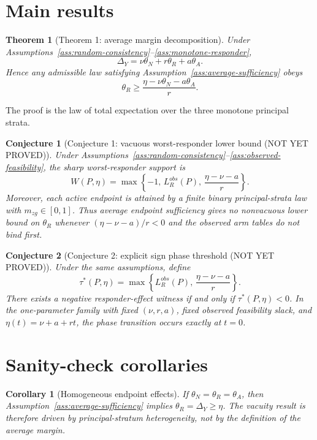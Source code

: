 \documentclass[11pt]{article}
\theoremstyle{definition}
\theoremstyle{plain}
\newtheorem{theorem}{Theorem}
\newtheorem{conjecture}{Conjecture}
\newtheorem{corollary}{Corollary}
\theoremstyle{remark}
\begin{document}
\section{Main results}
\begin{theorem}[Theorem 1: average margin decomposition]\label{thm:decomposition}
Under Assumptions~\ref{ass:random-consistency}--\ref{ass:monotone-responder},
\[
  \Delta_Y=\nu\theta_N+r\theta_R+a\theta_A.
\]
Hence any admissible law satisfying Assumption~\ref{ass:average-sufficiency} obeys
\[
  \theta_R\ge \frac{\eta-\nu\theta_N-a\theta_A}{r}.
\]
\end{theorem}
The proof is the law of total expectation over the three monotone principal strata.

\begin{conjecture}[Conjecture 1: vacuous worst-responder lower bound (NOT YET PROVED)]\label{conj:vacuity}
Under Assumptions~\ref{ass:random-consistency}--\ref{ass:observed-feasibility}, the sharp worst-responder support is
\[
  W(P,\eta)=
  \max\left\{
    -1,\,
    L_R^{obs}(P),\,
    \frac{\eta-\nu-a}{r}
  \right\}.
\]
Moreover, each active endpoint is attained by a finite binary principal-strata law with \(m_{z g}\in[0,1]\).  Thus average endpoint sufficiency gives no nonvacuous lower bound on \(\theta_R\) whenever \((\eta-\nu-a)/r<0\) and the observed arm tables do not bind first.
\end{conjecture}

\begin{conjecture}[Conjecture 2: explicit sign phase threshold (NOT YET PROVED)]\label{conj:threshold}
Under the same assumptions, define
\[
  \tau^*(P,\eta)=
  \max\left\{
    L_R^{obs}(P),\,
    \frac{\eta-\nu-a}{r}
  \right\}.
\]
There exists a negative responder-effect witness if and only if \(\tau^*(P,\eta)<0\).  In the one-parameter family with fixed \((\nu,r,a)\), fixed observed feasibility slack, and \(\eta(t)=\nu+a+rt\), the phase transition occurs exactly at \(t=0\).
\end{conjecture}

\section{Sanity-check corollaries}
\begin{corollary}[Homogeneous endpoint effects]\label{cor:homogeneous}
If \(\theta_N=\theta_R=\theta_A\), then Assumption~\ref{ass:average-sufficiency} implies \(\theta_R=\Delta_Y\ge\eta\).  The vacuity result is therefore driven by principal-stratum heterogeneity, not by the definition of the average margin.
\end{corollary}
\end{document}
